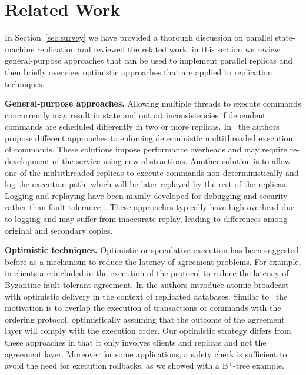 \documentclass[conference]{IEEEtran}
\begin{document}
\section{Related Work}
\label{sec:rwork}
In Section~\ref{sec:survey} we have provided a thorough discussion on parallel state-machine replication and reviewed the related work, in this section we review general-purpose approaches that can be used to implement parallel replicas and then briefly overview optimistic approaches that are applied to replication techniques. 


\noindent \textbf{General-purpose approaches.} 
Allowing multiple threads to execute commands concurrently may result in state and output inconsistencies if dependent commands are scheduled differently in two or more replicas. In~\cite{AWHF2010,bhcls2010, DLCOM2009, TA2010} the authors propose different approaches to enforcing deterministic multithreaded execution of commands. These solutions impose performance overheads and may require re-development of the service using new abstractions. Another solution is to allow one of the multithreaded replicas to execute commands non-deterministically and log the execution path, which will be later replayed by the rest of the replicas. Logging and replaying have been mainly developed for debugging and security rather than fault tolerance~\cite{AS2009, DLFC2008, PC2008, PZXYKLL2009, RB1999, VLWOCFN2011, XBH2003}. These approaches typically have high overhead due to logging and may suffer from inaccurate replay, leading to differences among original and secondary copies. 

\noindent \textbf{Optimistic techniques.} Optimistic or speculative execution has been suggested before as a mechanism to reduce the latency of agreement problems. For example, in \cite{Kotla:2007, Wester:2009} clients are included in the execution of the protocol to reduce the latency of Byzantine fault-tolerant agreement. In \cite{JPPM02, KPAS99} the authors introduce atomic broadcast with optimistic delivery in the context of replicated databases. Similar to~\cite{marandi2011high} the motivation is to overlap the execution of transactions or commands with the ordering protocol, optimistically assuming that the outcome of the agreement layer will comply with the execution order. Our optimistic strategy differs from these approaches in that it only involves clients and replicas and not the agreement layer. Moreover for some applications, a safety check is sufficient to avoid the need for execution rollbacks, as we showed with a B$^+$-tree example. 
\end{document}
